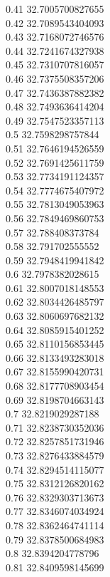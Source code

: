 {0.41	32.7005700827655\\
0.42	32.7089543404093\\
0.43	32.7168072746576\\
0.44	32.7241674327938\\
0.45	32.7310707816057\\
0.46	32.7375508357206\\
0.47	32.7436387882382\\
0.48	32.7493636414204\\
0.49	32.7547523357113\\
0.5	32.7598298757844\\
0.51	32.7646194526559\\
0.52	32.7691425611759\\
0.53	32.7734191124357\\
0.54	32.7774675407972\\
0.55	32.7813049053963\\
0.56	32.7849469860753\\
0.57	32.788408373784\\
0.58	32.791702555552\\
0.59	32.7948419941842\\
0.6	32.7978382028615\\
0.61	32.8007018148553\\
0.62	32.8034426485797\\
0.63	32.8060697682132\\
0.64	32.8085915401252\\
0.65	32.8110156853445\\
0.66	32.8133493283018\\
0.67	32.8155990420731\\
0.68	32.8177708903454\\
0.69	32.8198704663143\\
0.7	32.8219029287188\\
0.71	32.8238730352036\\
0.72	32.8257851731946\\
0.73	32.8276433884579\\
0.74	32.8294514115077\\
0.75	32.8312126820162\\
0.76	32.8329303713673\\
0.77	32.8346074034924\\
0.78	32.8362464741114\\
0.79	32.8378500684983\\
0.8	32.8394204778796\\
0.81	32.8409598145699\\
}
